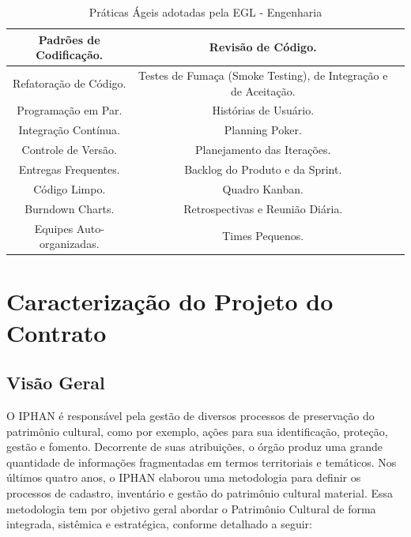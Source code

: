 \begin{table}[H]
\center
\footnotesize
\begin{tabular}{|c|c|c|}
\hline
Padrões de Codificação.              &   Revisão de Código.                \\ \hline
Refatoração de Código.     &  Testes de Fumaça (Smoke Testing), de Integração e de Aceitação.            \\ \hline
 Programação em Par.              &   Histórias de Usuário.               \\ \hline
Integração Contínua.         &   Planning Poker.             \\ \hline
Controle de Versão.          &   Planejamento das Iterações.               \\ \hline
Entregas Frequentes.            &   Backlog do Produto e da Sprint.             \\ \hline
 Código Limpo.   &  Quadro Kanban.            \\ \hline
Burndown Charts.   &  Retrospectivas e Reunião Diária.        \\ \hline
Equipes Auto-organizadas.   &  Times Pequenos.           \\ \hline
\end{tabular}
\caption{Práticas Ágeis adotadas pela EGL - Engenharia}
\end{table}


\section[Caracterização do Projeto Contrato]{Caracterização do Projeto do Contrato}

\subsection[Visão Geral]{Visão Geral}

O IPHAN é responsável pela gestão de diversos processos de preservação do patrimônio cultural, como por exemplo, ações para sua identificação, proteção, gestão e fomento. Decorrente
de suas atribuições, o órgão produz uma grande quantidade de informações fragmentadas em termos territoriais e temáticos. Nos últimos quatro anos, o IPHAN elaborou uma metodologia
para definir os processos de cadastro, inventário e gestão do patrimônio cultural material. Essa metodologia tem por objetivo geral abordar o Patrimônio Cultural de forma integrada, sistêmica
e estratégica, conforme detalhado a seguir:

